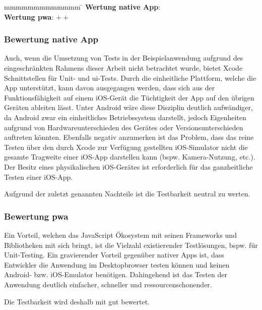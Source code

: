 \begin{tabbing}
	mmmmmmmmmmmmm				\= \kill
	\textbf{Wertung native App}: \> \Circle \\
\textbf{Wertung \ac{pwa}}: \> $++$
\end{tabbing}

\subsubsection{Bewertung native App}
Auch, wenn die Umsetzung von Tests in der Beispielanwendung aufgrund des eingeschränkten Rahmens dieser Arbeit nicht betrachtet wurde, bietet Xcode Schnittstellen für Unit- und \ac{ui}-Tests. Durch die einheitliche Plattform, welche die App unterstützt, kann davon ausgegangen werden, dass sich aus der Funktionsfähigkeit auf einem iOS-Gerät die Tüchtigkeit der App auf den übrigen Geräten ableiten lässt. Unter Android wäre diese Disziplin deutlich aufwändiger, da Android zwar ein einheitliches Betriebssystem darstellt, jedoch Eigenheiten aufgrund von Hardwareunterschieden des Gerätes oder Versionsunterschieden auftreten könnten. Ebenfalls negativ anzumerken ist das Problem, dass das reine Testen über den durch Xcode zur Verfügung gestellten iOS-Simulator nicht die gesamte Tragweite einer iOS-App darstellen kann (bspw. Kamera-Nutzung, etc.). Der Besitz eines physikalischen iOS-Gerätes ist erforderlich für das ganzheitliche Testen einer iOS-App.

Aufgrund der zuletzt genannten Nachteile ist die Testbarkeit neutral zu werten.

\subsubsection{Bewertung \ac{pwa}}
Ein Vorteil, welchen das JavaScript Ökosystem mit seinen Frameworks und Bibliotheken mit sich bringt, ist die Vielzahl existierender Testlösungen, bspw. für Unit-Testing. Ein gravierender Vorteil gegenüber nativer Apps ist, dass Entwickler die Anwendung im Desktopbrowser testen können und keinen Android- bzw. iOS-Emulator benötigen. Dahingehend ist das Testen der Anwendung deutlich einfacher, schneller und ressourcenschonender.

Die Testbarkeit wird deshalb mit gut bewertet.